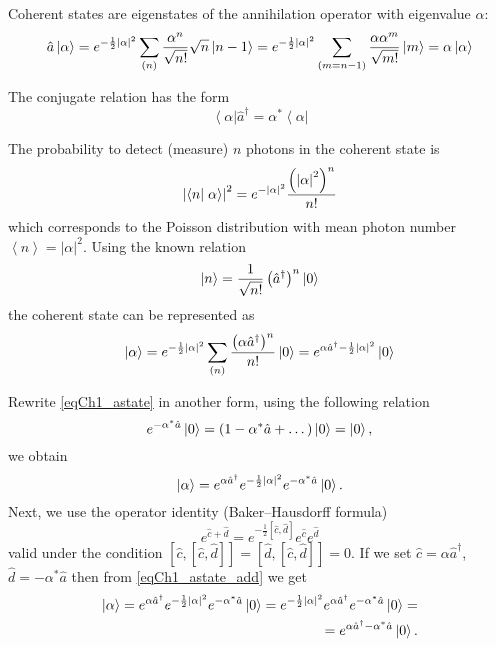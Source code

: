 Coherent states are eigenstates of the annihilation operator
with eigenvalue $\alpha$: 
\begin{equation}
\hat{a}\left|\alpha\right> = e^{-\frac{1}{2} \left|\alpha\right|^2}
\sum_{(n)} \frac{\alpha^n}{\sqrt{n!}}\sqrt{n}\ket{n - 1} = 
e^{-\frac{1}{2} \left|\alpha\right|^2}
\sum_{(m = n - 1)} \frac{\alpha \alpha^m}{\sqrt{m!}}\ket{m} = 
\alpha\left|\alpha\right>
\end{equation}

The conjugate relation has the form
\begin{equation}
\left<\alpha\right|\hat{a}^{\dag} =  
\alpha^{*}\left<\alpha\right|
\end{equation}

The probability to detect (measure) $n$ photons in the coherent state is
\begin{equation}
\left|\bra{n}\left.\alpha\right>\right|^2 =
e^{-\left|\alpha\right|^2}
\frac{\left(\left|\alpha\right|^2\right)^n}{n!}
\label{eqCh1_PuassonCoh}
\end{equation}
which corresponds to the Poisson distribution
with mean photon number  
$\left<n\right> = \left|\alpha\right|^2$. Using the known relation 
\begin{equation}
\ket{n} = \frac{1}{\sqrt{n!}}
\left(\hat{a}^{\dag}\right)^n\ket{0}
\label{eqCh1_nstate}
\end{equation}
the coherent state can be represented as
\begin{equation}
\left|\alpha\right> = e^{-\frac{1}{2} \left|\alpha\right|^2}\sum_{(n)}
\frac{\left(\alpha \hat{a}^{\dag}\right)^n}{n!}\ket{0} = 
e^{\alpha \hat{a}^{\dag} -
  \frac{1}{2}\left|\alpha\right|^2}\ket{0}
\label{eqCh1_astate}
\end{equation}

Rewrite \eqref{eqCh1_astate} in another form, using the following relation
\[
e^{- \alpha^{*} \hat{a}} \ket{0} = \left(1 - \alpha^{*} \hat{a} +
\dots\right) \ket{0} = \ket{0},
\]
we obtain
\begin{equation}
\left|\alpha\right> = 
e^{\alpha \hat{a}^{\dag}} 
e^{-\frac{1}{2}\left|\alpha\right|^2}
e^{- \alpha^{*} \hat{a}} 
\ket{0}.
\label{eqCh1_astate_add}
\end{equation}
Next, we use the operator identity (Baker–Hausdorff formula)
\begin{equation}
e^{\hat{c} + \hat{d}} = e^{- \frac{1}{2}\left[\hat{c},
    \hat{d}\right]}e^{\hat{c}} e^{\hat{d}} 
\label{eqPart1Ch1_BeikerHausdorf}
\end{equation}
valid under the condition  
$\left[\hat{c},\left[\hat{c}, \hat{d}\right]\right] =
\left[\hat{d},\left[\hat{c}, \hat{d}\right]\right] = 0$.
If we set $\hat{c} = \alpha\hat{a}^{\dag}$, $\hat{d} = -\alpha^*\hat{a}$
then from \eqref{eqCh1_astate_add} we get 
\begin{eqnarray}
\left|\alpha\right> =  
e^{\alpha \hat{a}^{\dag}} 
e^{-\frac{1}{2}\left|\alpha\right|^2}
e^{- \alpha^{*} \hat{a}} 
\ket{0} =
e^{-\frac{1}{2}\left|\alpha\right|^2}
e^{\alpha \hat{a}^{\dag}} 
e^{- \alpha^{*} \hat{a}} 
\ket{0} = 
\nonumber \\
=
e^{\alpha \hat{a}^{\dag} - \alpha^{*} \hat{a}}\ket{0}.
\label{eqCh1_astate4squeezed}
\end{eqnarray}

